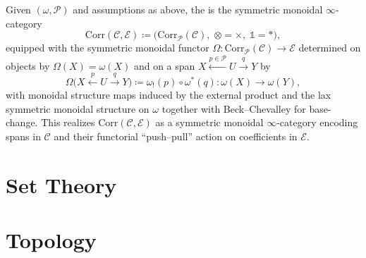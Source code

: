 \begin{definition}
Given $(\omega,\mathcal{P})$ and assumptions as above, the  is the symmetric monoidal $\infty$-category
\[
\mathrm{Corr}(\mathcal{C},\mathcal{E}) \coloneqq \big(\mathrm{Corr}_{\mathcal{P}}(\mathcal{C}),\;\otimes=\times,\;\mathds{1}=*\big),
\]
equipped with the symmetric monoidal functor $\Omega\colon \mathrm{Corr}_{\mathcal{P}}(\mathcal{C})\to \mathcal{E}$ determined on objects by $\Omega(X)=\omega(X)$ and on a span $X\xleftarrow{p\in \mathcal{P}} U\xrightarrow{q} Y$ by
\[
\Omega\big(X\xleftarrow{p} U\xrightarrow{q} Y\big)\coloneqq \omega_!(p)\circ \omega^*(q)\colon \omega(X)\to \omega(Y),
\]
with monoidal structure maps induced by the external product and the lax symmetric monoidal structure on $\omega$ together with Beck–Chevalley for base-change. This realizes $\mathrm{Corr}(\mathcal{C},\mathcal{E})$ as a symmetric monoidal $\infty$-category encoding spans in $\mathcal{C}$ and their functorial “push–pull” action on coefficients in $\mathcal{E}$.
\end{definition}





\appendix

\section{Set Theory}






% 

\section{Topology}










